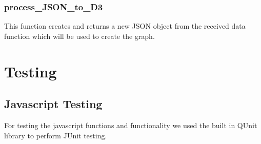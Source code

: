 \documentclass{article}
\begin{document}
\subsubsection*{process\_JSON\_to\_D3}
This function creates and returns a new JSON object from the received data function which will be used to create the graph.

\section{Testing}
\subsection{Javascript Testing}
For testing the javascript functions and functionality we used the built in QUnit library to perform JUnit testing.
\end{document}
